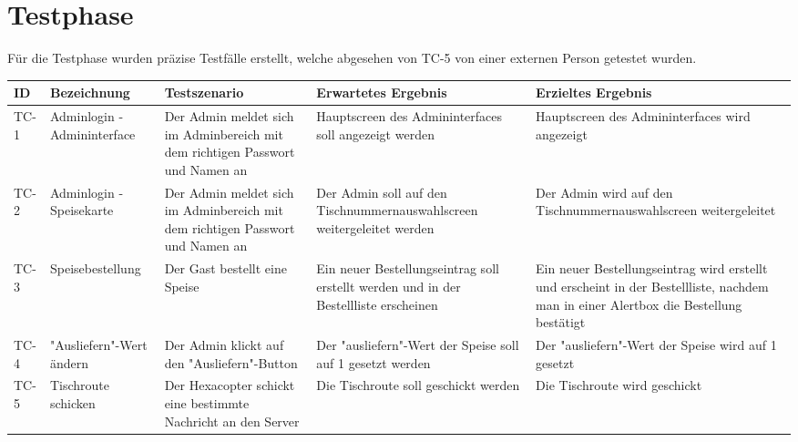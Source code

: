 \chapter{Testphase}
\renewcommand{\kapitelautor}{Katharina Joksch}
Für die Testphase wurden präzise Testfälle erstellt, welche abgesehen von TC-5 von einer externen Person getestet wurden.

\begin{table}[H]
\centering
\begin{tabular}{|p{1cm}|p{3cm}|p{3cm}|p{3cm}|p{3cm}|}
\hline \textbf{ID} & \textbf{Bezeichnung} & \textbf{Testszenario} & \textbf{Erwartetes Ergebnis} & \textbf{Erzieltes Ergebnis} \\\hline
\hline TC-1 & Adminlogin - Admininterface & Der Admin meldet sich im Adminbereich mit dem richtigen Passwort und Namen an & Hauptscreen des Admininterfaces soll angezeigt werden & Hauptscreen des Admininterfaces wird angezeigt \\\hline
\hline TC-2 & Adminlogin - Speisekarte & Der Admin meldet sich im Adminbereich mit dem richtigen Passwort und Namen an & Der Admin soll auf den Tischnummernauswahlscreen weitergeleitet werden & Der Admin wird auf den Tischnummernauswahlscreen weitergeleitet \\\hline
\hline TC-3 & Speisebestellung & Der Gast bestellt eine Speise & Ein neuer Bestellungseintrag soll erstellt werden und in der Bestellliste erscheinen & Ein neuer Bestellungseintrag wird erstellt und erscheint in der Bestellliste, nachdem man in einer Alertbox die Bestellung bestätigt \\\hline
\hline TC-4 & "Ausliefern"-Wert ändern & Der Admin klickt auf den "Ausliefern"-Button & Der "ausliefern"-Wert der Speise soll auf 1 gesetzt werden & Der "ausliefern"-Wert der Speise wird auf 1 gesetzt \\\hline
\hline TC-5 & Tischroute schicken & Der Hexacopter schickt eine bestimmte Nachricht an den Server & Die Tischroute soll geschickt werden & Die Tischroute wird geschickt \\\hline
\end{tabular}
\end{table}
